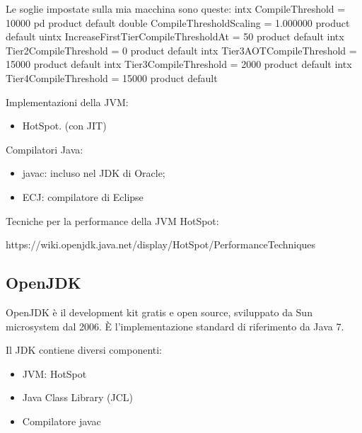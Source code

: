 \documentclass[a4paper, 11pt,            %
openright,               %
italian,
english                 
]{article}       %
\begin{document}
	Le soglie impostate sulla mia macchina sono queste:
	intx CompileThreshold                         = 10000                                  {pd product} {default}
	double CompileThresholdScaling                  = 1.000000                                  {product} {default}
	uintx IncreaseFirstTierCompileThresholdAt      = 50                                        {product} {default}
	intx Tier2CompileThreshold                    = 0                                         {product} {default}
	intx Tier3AOTCompileThreshold                 = 15000                                     {product} {default}
	intx Tier3CompileThreshold                    = 2000                                      {product} {default}
	intx Tier4CompileThreshold                    = 15000                                     {product} {default}
	
	
	
	
	
	
	
	
	Implementazioni della JVM:
	\begin{itemize}
		\item HotSpot. (con JIT)
	\end{itemize}
	
	Compilatori Java:
	\begin{itemize}
		\item javac: incluso nel JDK di Oracle;
		\item ECJ: compilatore di Eclipse
	\end{itemize}
	
	Tecniche per la performance della JVM HotSpot:
	\begin{center}
		https://wiki.openjdk.java.net/display/HotSpot/PerformanceTechniques
	\end{center}
	
	\subsection{OpenJDK}
	
	OpenJDK è il development kit gratis e open source, sviluppato da Sun microsystem dal 2006. È l'implementazione standard di riferimento da Java 7.
	
	Il JDK contiene diversi componenti: 
	\begin{itemize}
		\item JVM: HotSpot
		\item Java Class Library (JCL)
		\item Compilatore javac
	\end{itemize}
	
\end{document}
